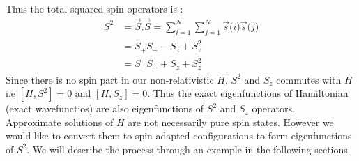 \documentclass[11pt]{article}   	%
\begin{document}
	Thus the total squared spin operators is :\\
	\begin{equation}
	\begin{split}
		S^2 &=\vec{S} .\vec{S}=\sum_{i=1}^N \sum_{j=1}^N \vec{s}\big(i\big)\vec{s}\big(j\big)\\
			&=S_+S_--S_z+S_z^2\\
			&=S_-S_++S_z+S_z^2
	\end{split}
	\end{equation}
	Since there is no spin part in our non-relativistic $H$, $S^2$ and $S_z$ commutes with $H$ 
	i.e $[H,S^2]=0$	and $[H,S_z]=0$. Thus the exact eigenfunctions of Hamiltonian (exact wavefunctios) 
	are also eigenfunctions of $S^2$ and $S_z$ operators.\\ 
	Approximate solutions of $H$ are not necessarily pure spin states. However we would like to convert
	them to spin adapted configurations to form eigenfunctions of $S^2$. We will describe the process 
	through an example in the following sections. \\
	
\end{document}
